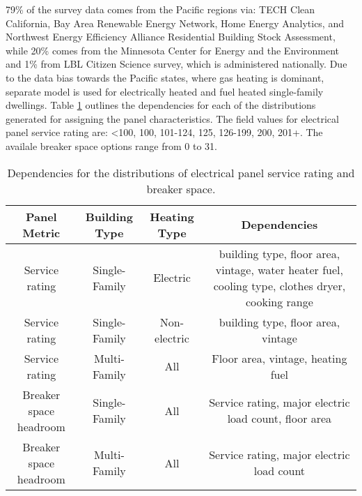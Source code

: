 79\% of the survey data comes from the Pacific regions via: TECH Clean California, Bay Area Renewable Energy Network, Home Energy Analytics, and Northwest Energy Efficiency Alliance Residential Building Stock Assessment, while 20\% comes from the Minnesota Center for Energy and the Environment and 1\% from LBL Citizen Science survey, which is administered nationally. 
Due to the data bias towards the Pacific states, where gas heating is dominant, separate model is used for electrically heated and fuel heated single-family dwellings. Table \ref{tab:panel_deps} outlines the dependencies for each of the distributions generated for assigning the panel characteristics. The field values for electrical panel service rating are: <100, 100, 101-124, 125, 126-199, 200, 201+. The availale breaker space options range from 0 to 31.

\begin{table}
  \caption{Dependencies for the distributions of electrical panel service rating and breaker space.}
  \label{tab:panel_deps}
  \centering
  \begin{tabular}{|c|c|c|c|}
  \hline
      Panel Metric & Building Type & Heating Type & Dependencies\\
      \hline
      Service rating & Single-Family & Electric & building type, floor area, vintage, water heater fuel, cooling type, clothes dryer, cooking range\\
      Service rating & Single-Family & Non-electric & building type, floor area, vintage\\
      Service rating & Multi-Family & All & Floor area, vintage, heating fuel\\
      Breaker space headroom & Single-Family & All & Service rating, major electric load count, floor area\\
      Breaker space headroom & Multi-Family & All & Service rating, major electric load count\\
      \hline
  \end{tabular}
\end{table}

